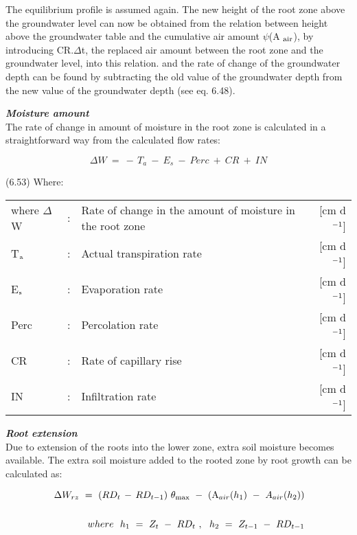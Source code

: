 The equilibrium profile is assumed again. The new height of the root zone above the
groundwater level can now be obtained from the relation between height above the
groundwater table and the cumulative air amount $\psi$(A $_{{\rm air}}$), by introducing CR.$\Delta$t, the
replaced air amount between the root zone and the groundwater level, into this relation.
and the rate of change of the groundwater depth can be found by subtracting the old value
of the groundwater depth from the new value of the groundwater depth (see eq. 6.48). 




 {\bf {\it Moisture amount\/}}\\
The rate of change in amount of moisture in the root zone is calculated in a straightfor\-ward way from the calculated flow rates:

\begin{equation}
\Delta W ~=~ -\, T _{a} ~-~ E _{s} ~-~ Perc ~+~ CR ~+~ IN
\end{equation}

 
\strut\hfill (6.53)
Where:\\
\begin{tabularx}{\textwidth}{llXr}



where $\Delta$W &:& Rate of change in the amount of moisture in the root zone  & [cm d$^{{\rm -1}}$]\\
T$_{{\rm a}}$ &:& Actual transpiration rate  & [cm d$^{{\rm -1}}$]\\
E$_{{\rm s}}$ &:& Evaporation rate  & [cm d$^{{\rm -1}}$]\\
Perc &:& Percolation rate  & [cm d$^{{\rm -1}}$]\\
CR &:& Rate of capillary rise  & [cm d$^{{\rm -1}}$]\\
IN &:& Infiltration rate  & [cm d$^{{\rm -1}}$]
\end{tabularx}



{\it {\bf Root extension}\/}\\
Due to extension of the roots into the lower zone, extra soil moisture becomes available.
The extra soil moisture added to the rooted zone by root growth can be calculated as:

\begin{eqnarray*}
\, \Delta W _{rz} ~=~(RD _{t} \, -\, RD _{t-1} )~\theta _{\max } ~-~({\rm A} _{air} (h _{1} )~-~A _{air} (h _{2} ))  \nonumber  \\
\, \nonumber  \\
where~~h _{1} ~=~Z _{t~} -~RD _{t~} ,~~h _{2} ~=~Z _{t-1} ~-~RD _{t-1}
\end{eqnarray*}

